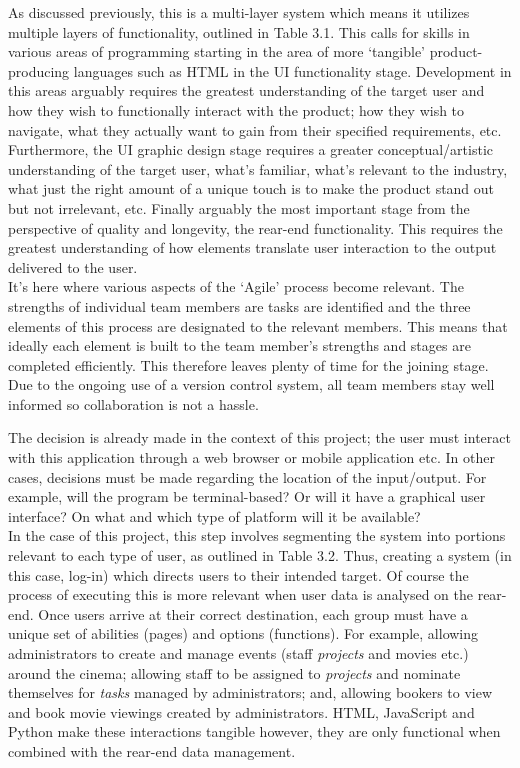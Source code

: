 \documentclass[11pt, english]{article}
\begin{document}
	As discussed previously, this is a multi-layer system which means it utilizes multiple layers of functionality, outlined in Table 3.1. This calls for skills in various areas of programming starting in the area of more `tangible' product-producing languages such as HTML in the UI functionality stage. Development in this areas arguably requires the greatest understanding of the target user and how they wish to functionally interact with the product; how they wish to navigate, what they actually want to gain from their specified requirements, etc. Furthermore, the UI graphic design stage requires a greater conceptual/artistic understanding of the target user, what's familiar, what's relevant to the industry, what just the right amount of a unique touch is to make the product stand out but not irrelevant, etc. Finally arguably the most important stage from the perspective of quality and longevity, the rear-end functionality. This requires the greatest understanding of how elements translate user interaction to the output delivered to the user.\\

	It's here where various aspects of the `Agile' process become relevant. The strengths of individual team members are tasks are identified and the three elements of this process are designated to the relevant members. This means that ideally each element is built to the team member's strengths and stages are completed efficiently. This therefore leaves plenty of time for the joining stage. Due to the ongoing use of a version control system, all team members stay well informed so collaboration is not a hassle.

	The decision is already made in the context of this project; the user must interact with this application through a web browser or mobile application etc. In other cases, decisions must be made regarding the location of the input/output. For example, will the program be terminal-based? Or will it have a graphical user interface? On what and which type of platform will it be available?\\

	In the case of this project, this step involves segmenting the system into portions relevant to each type of user, as outlined in Table 3.2. Thus, creating a system (in this case, log-in) which directs users to their intended target. Of course the process of executing this is more relevant when user data is analysed on the rear-end. Once users arrive at their correct destination, each group must have a unique set of abilities (pages) and options (functions). For example, allowing administrators to create and manage events (staff \textit{projects} and movies etc.) around the cinema; allowing staff to be assigned to \textit{projects} and nominate themselves for \textit{tasks} managed by administrators; and, allowing bookers to view and book movie viewings created by administrators. HTML, JavaScript and Python make these interactions tangible however, they are only functional when combined with the rear-end data management.
\end{document}
